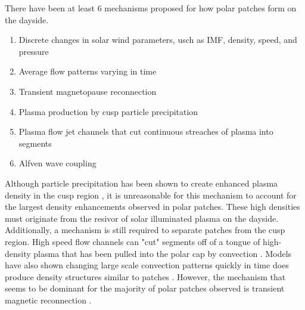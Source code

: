 There have been at least 6 mechanisms proposed for how polar patches form on the dayside.
\begin{enumerate}
	\item Discrete changes in solar wind parameters, usch as IMF, density, speed, and pressure \citep{Sojka1994}
	\item Average flow patterns varying in time \citep{Anderson1988}
	\item Transient magnetopause reconnection \citep{Lockwook1992}
	\item Plasma production by cusp particle precipitation \citep{Roger1994,Millward1999}
	\item Plasma flow jet channels that cut continuous streaches of plasma into segments 	\citep{Valladares1998}
	\item Alfven wave coupling \citep{Prikryl1999}
\end{enumerate}
Although particle precipitation has been shown to create enhanced plasma density in the cusp region \citep{Roger1994}, it is unreasonable for this mechanism to account for the largest density enhancements observed in polar patches.  These high densities must originate from the resivor of solar illuminated plasma on the dayside.  Additionally, a mechanism is still required to separate patches from the cusp region.  High speed flow channels can "cut" segments off of a tongue of high-density plasma that has been pulled into the polar cap by convection \citep{Valladares1994,Valladares1998}.  Models have also shown changing large scale convection patterns quickly in time does produce density structures similar to patches \citep{Anderson1988}.  However, the mechanism that seems to be dominant for the majority of polar patches observed is transient magnetic reconnection \citep{Carlson2012}.

